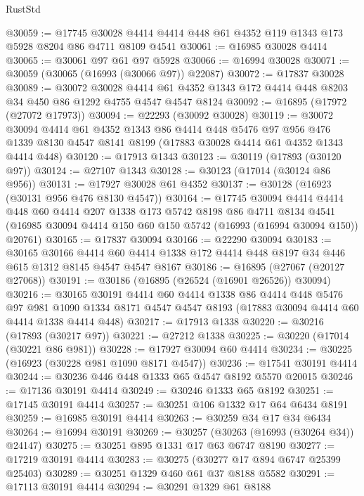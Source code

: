 \begin{lexlean}{RustStd}
\begin{coremodule}
{\begin{coremodule}
{{{{{{{{{{{{{{{{{{{{{{{{{{{{{{{{{{{{{{{{{{{{{{{{{{{{{{{@30059 := @17745 @30028 @4414 @4414 @448 @61 @4352 @119 @1343 @173 @5928 @8204 @86 @4711 @8109 @4541
@30061 := @16985 @30028 @4414
@30065 := @30061 @97 @61 @97 @5928
@30066 := @16994 @30028
@30071 := @30059 (@30065 (@16993 (@30066 @97)) @22087)
@30072 := @17837 @30028
@30089 := @30072
    @30028
    @4414
    @61
    @4352
    @1343
    @172
    @4414
    @448
    @8203
    @34
    @450
    @86
    @1292
    @4755
    @4547
    @4547
    @8124
@30092 := @16895 (@17972 (@27072 @17973))
@30094 := @22293 (@30092 @30028)
@30119 := @30072
    @30094
    @4414
    @61
    @4352
    @1343
    @86
    @4414
    @448
    @5476
    @97
    @956
    @476
    @1339
    @8130
    @4547
    @8141
    @8199
    (@17883 @30028 @4414 @61 @4352 @1343 @4414 @448)
@30120 := @17913 @1343
@30123 := @30119 (@17893 (@30120 @97))
@30124 := @27107 @1343
@30128 := @30123 (@17014 (@30124 @86 @956))
@30131 := @17927 @30028 @61 @4352
@30137 := @30128 (@16923 (@30131 @956 @476 @8130 @4547))
@30164 := @17745
    @30094
    @4414
    @4414
    @448
    @60
    @4414
    @207
    @1338
    @173
    @5742
    @8198
    @86
    @4711
    @8134
    @4541
    (@16985 @30094 @4414 @150 @60 @150 @5742 (@16993 (@16994 @30094 @150)) @20761)
@30165 := @17837 @30094
@30166 := @22290 @30094
@30183 := @30165
    @30166
    @4414
    @60
    @4414
    @1338
    @172
    @4414
    @448
    @8197
    @34
    @446
    @615
    @1312
    @8145
    @4547
    @4547
    @8167
@30186 := @16895 (@27067 (@20127 @27068))
@30191 := @30186 (@16895 (@26524 (@16901 @26526)) @30094)
@30216 := @30165
    @30191
    @4414
    @60
    @4414
    @1338
    @86
    @4414
    @448
    @5476
    @97
    @981
    @1090
    @1334
    @8171
    @4547
    @4547
    @8193
    (@17883 @30094 @4414 @60 @4414 @1338 @4414 @448)
@30217 := @17913 @1338
@30220 := @30216 (@17893 (@30217 @97))
@30221 := @27212 @1338
@30225 := @30220 (@17014 (@30221 @86 @981))
@30228 := @17927 @30094 @60 @4414
@30234 := @30225 (@16923 (@30228 @981 @1090 @8171 @4547))
@30236 := @17541 @30191 @4414
@30244 := @30236 @446 @448 @1333 @65 @4547 @8192 @5570 @20015
@30246 := @17136 @30191 @4414
@30249 := @30246 @1333 @65 @8192
@30251 := @17145 @30191 @4414
@30257 := @30251 @106 @1332 @17 @64 @6434 @8191
@30259 := @16985 @30191 @4414
@30263 := @30259 @34 @17 @34 @6434
@30264 := @16994 @30191
@30269 := @30257 (@30263 (@16993 (@30264 @34)) @24147)
@30275 := @30251 @895 @1331 @17 @63 @6747 @8190
@30277 := @17219 @30191 @4414
@30283 := @30275 (@30277 @17 @894 @6747 @25399 @25403)
@30289 := @30251 @1329 @460 @61 @37 @8188 @5582
@30291 := @17113 @30191 @4414
@30294 := @30291 @1329 @61 @8188
}}}}}}}}}}}}}}}}}}}}}}}}}}}}}}}}}}}}}}}}}}}}}}}}}}}}}}}
\end{coremodule}}
\end{coremodule}
\end{lexlean}
